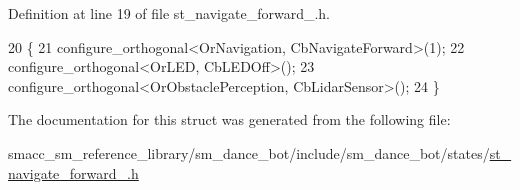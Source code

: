 Definition at line 19 of file st\+\_\+navigate\+\_\+forward\+\_.\+h.


\begin{DoxyCode}
20   \{
21     configure\_orthogonal<OrNavigation, CbNavigateForward>(1);
22     configure\_orthogonal<OrLED, CbLEDOff>();
23     configure\_orthogonal<OrObstaclePerception, CbLidarSensor>();
24   \}
\end{DoxyCode}


The documentation for this struct was generated from the following file\+:\begin{DoxyCompactItemize}
\item 
smacc\+\_\+sm\+\_\+reference\+\_\+library/sm\+\_\+dance\+\_\+bot/include/sm\+\_\+dance\+\_\+bot/states/\hyperlink{sm__dance__bot_2include_2sm__dance__bot_2states_2st__navigate__forward__1_8h}{st\+\_\+navigate\+\_\+forward\+\_.\+h}\end{DoxyCompactItemize}

